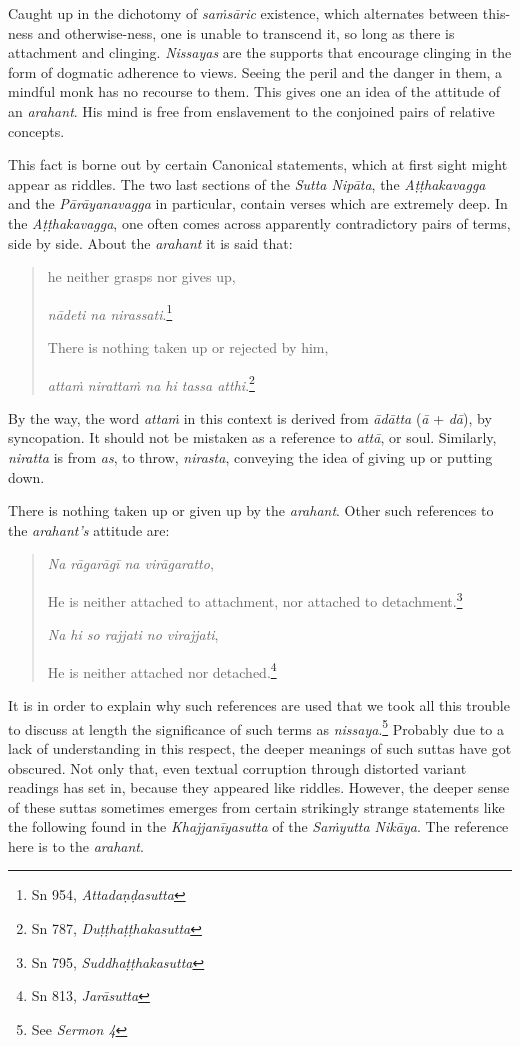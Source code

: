 Caught up in the dichotomy of \emph{saṁsāric} existence, which alternates between this-ness and otherwise-ness, one is unable to transcend it, so long as there is attachment and clinging. \emph{Nissayas} are the supports that encourage clinging in the form of dogmatic adherence to views. Seeing the peril and the danger in them, a mindful monk has no recourse to them. This gives one an idea of the attitude of an \emph{arahant}. His mind is free from enslavement to the conjoined pairs of relative concepts.

This fact is borne out by certain Canonical statements, which at first sight might appear as riddles. The two last sections of the \emph{Sutta Nipāta}, the \emph{Aṭṭhakavagga} and the \emph{Pārāyanavagga} in particular, contain verses which are extremely deep. In the \emph{Aṭṭhakavagga}, one often comes across apparently contradictory pairs of terms, side by side. About the \emph{arahant} it is said that:

\begin{quote}
he neither grasps nor gives up,

\emph{nādeti na nirassati}.\footnote{Sn 954, \emph{Attadaṇḍasutta}}

There is nothing taken up or rejected by him,

\emph{attaṁ nirattaṁ na hi tassa atthi}.\footnote{Sn 787, \emph{Duṭṭhaṭṭhakasutta}}
\end{quote}

By the way, the word \emph{attaṁ} in this context is derived from \emph{ādātta} (\emph{ā} + \emph{dā}), by syncopation. It should not be mistaken as a reference to \emph{attā}, or soul. Similarly, \emph{niratta} is from \emph{as}, to throw, \emph{nirasta}, conveying the idea of giving up or putting down.

There is nothing taken up or given up by the \emph{arahant}. Other such references to the \emph{arahant's} attitude are:

\begin{quote}
\emph{Na rāgarāgī na virāgaratto},

He is neither attached to attachment, nor attached to detachment.\footnote{Sn 795, \emph{Suddhaṭṭhakasutta}}

\emph{Na hi so rajjati no virajjati},

He is neither attached nor detached.\footnote{Sn 813, \emph{Jarāsutta}}
\end{quote}

It is in order to explain why such references are used that we took all this trouble to discuss at length the significance of such terms as \emph{nissaya}.\footnote{See \emph{Sermon 4}} Probably due to a lack of understanding in this respect, the deeper meanings of such suttas have got obscured. Not only that, even textual corruption through distorted variant readings has set in, because they appeared like riddles. However, the deeper sense of these suttas sometimes emerges from certain strikingly strange statements like the following found in the \emph{Khajjanīyasutta} of the \emph{Saṁyutta Nikāya}. The reference here is to the \emph{arahant}.

